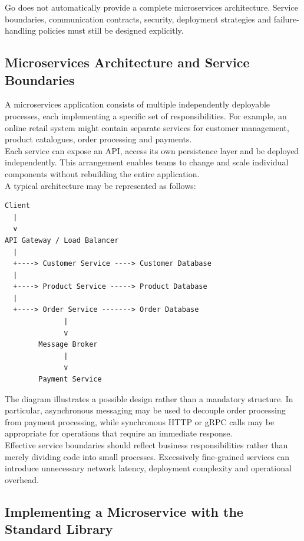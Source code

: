 Go does not automatically provide a complete microservices architecture. Service boundaries, communication contracts, security, deployment strategies and failure-handling policies must still be designed explicitly.

\subsection{Microservices Architecture and Service Boundaries}

A microservices application consists of multiple independently deployable processes, each implementing a specific set of responsibilities. For example, an online retail system might contain separate services for customer management, product catalogues, order processing and payments.\\

Each service can expose an API, access its own persistence layer and be deployed independently. This arrangement enables teams to change and scale individual components without rebuilding the entire application.\\

A typical architecture may be represented as follows:

\begin{lstlisting}
Client
  |
  v
API Gateway / Load Balancer
  |
  +----> Customer Service ----> Customer Database
  |
  +----> Product Service -----> Product Database
  |
  +----> Order Service -------> Order Database
              |
              v
        Message Broker
              |
              v
        Payment Service
\end{lstlisting}

The diagram illustrates a possible design rather than a mandatory structure. In particular, asynchronous messaging may be used to decouple order processing from payment processing, while synchronous HTTP or gRPC calls may be appropriate for operations that require an immediate response.\\

Effective service boundaries should reflect business responsibilities rather than merely dividing code into small processes. Excessively fine-grained services can introduce unnecessary network latency, deployment complexity and operational overhead.\\

\subsection{Implementing a Microservice with the Standard Library}

